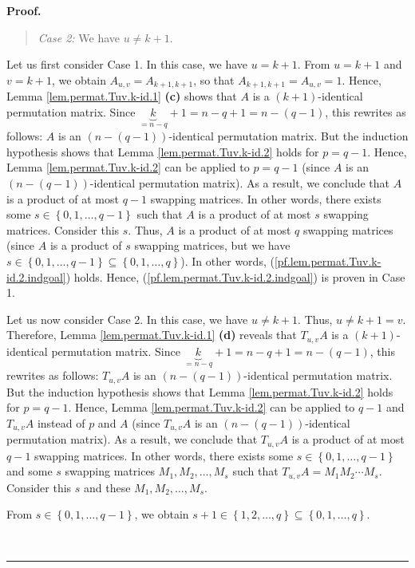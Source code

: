 \documentclass[numbers=enddot,12pt,final,onecolumn,notitlepage]{scrartcl}%
\theoremstyle{definition}
\newenvironment{statement}{\begin{quote}}{\end{quote}}
\newenvironment{proof}[1][Proof]{\noindent\textbf{#1.} }{\ \rule{0.5em}{0.5em}}
\begin{document}
\begin{proof}
\begin{statement}
\textit{Case 2:} We have $u\neq k+1$.
\end{statement}

Let us first consider Case 1. In this case, we have $u=k+1$. From $u=k+1$ and
$v=k+1$, we obtain $A_{u,v}=A_{k+1,k+1}$, so that $A_{k+1,k+1}=A_{u,v}=1$.
Hence, Lemma \ref{lem.permat.Tuv.k-id.1} \textbf{(c)} shows that $A$ is a
$\left(  k+1\right)  $-identical permutation matrix. Since $\underbrace{k}%
_{=n-q}+1=n-q+1=n-\left(  q-1\right)  $, this rewrites as follows: $A$ is an
$\left(  n-\left(  q-1\right)  \right)  $-identical permutation matrix. But
the induction hypothesis shows that Lemma \ref{lem.permat.Tuv.k-id.2} holds
for $p=q-1$. Hence, Lemma \ref{lem.permat.Tuv.k-id.2} can be applied to
$p=q-1$ (since $A$ is an $\left(  n-\left(  q-1\right)  \right)  $-identical
permutation matrix). As a result, we conclude that $A$ is a product of at most
$q-1$ swapping matrices. In other words, there exists some $s\in\left\{
0,1,\ldots,q-1\right\}  $ such that $A$ is a product of at most $s$ swapping
matrices. Consider this $s$. Thus, $A$ is a product of at most $q$ swapping
matrices (since $A$ is a product of $s$ swapping matrices, but we have
$s\in\left\{  0,1,\ldots,q-1\right\}  \subseteq\left\{  0,1,\ldots,q\right\}
$). In other words, (\ref{pf.lem.permat.Tuv.k-id.2.indgoal}) holds. Hence,
(\ref{pf.lem.permat.Tuv.k-id.2.indgoal}) is proven in Case 1.

Let us now consider Case 2. In this case, we have $u\neq k+1$. Thus, $u\neq
k+1=v$. Therefore, Lemma \ref{lem.permat.Tuv.k-id.1} \textbf{(d)} reveals that
$T_{u,v}A$ is a $\left(  k+1\right)  $-identical permutation matrix. Since
$\underbrace{k}_{=n-q}+1=n-q+1=n-\left(  q-1\right)  $, this rewrites as
follows: $T_{u,v}A$ is an $\left(  n-\left(  q-1\right)  \right)  $-identical
permutation matrix. But the induction hypothesis shows that Lemma
\ref{lem.permat.Tuv.k-id.2} holds for $p=q-1$. Hence, Lemma
\ref{lem.permat.Tuv.k-id.2} can be applied to $q-1$ and $T_{u,v}A$ instead of
$p$ and $A$ (since $T_{u,v}A$ is an $\left(  n-\left(  q-1\right)  \right)
$-identical permutation matrix). As a result, we conclude that $T_{u,v}A$ is a
product of at most $q-1$ swapping matrices. In other words, there exists some
$s\in\left\{  0,1,\ldots,q-1\right\}  $ and some $s$ swapping matrices
$M_{1},M_{2},\ldots,M_{s}$ such that $T_{u,v}A=M_{1}M_{2}\cdots M_{s}$.
Consider this $s$ and these $M_{1},M_{2},\ldots,M_{s}$.

From $s\in\left\{  0,1,\ldots,q-1\right\}  $, we obtain $s+1\in\left\{
1,2,\ldots,q\right\}  \subseteq\left\{  0,1,\ldots,q\right\}  $.


\end{proof}
\end{document}
